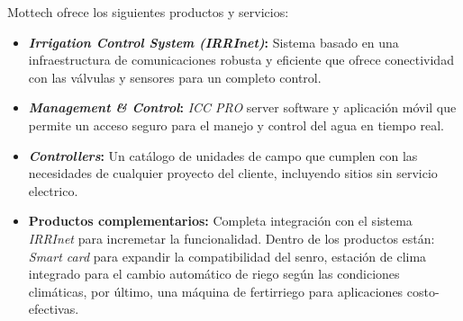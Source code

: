 Mottech ofrece los siguientes productos y servicios:
\begin{itemize}
    \item \textbf{\textit{Irrigation Control System (IRRInet)}:} Sistema basado en una infraestructura de comunicaciones robusta y eficiente que ofrece conectividad con las válvulas y sensores para un completo control.
    \item \textbf{\textit{Management \& Control}:} \textit{ICC PRO} server software y aplicación móvil que permite un acceso seguro para el manejo y control del agua en tiempo real.
    \item \textbf{\textit{Controllers}:} Un catálogo de unidades de campo que cumplen con las necesidades de cualquier proyecto del cliente, incluyendo sitios sin servicio electrico.
    \item \textbf{Productos complementarios:} Completa integración con el sistema \textit{IRRInet} para incremetar la funcionalidad. Dentro de los productos están: \textit{Smart card} para expandir la compatibilidad del senro, estación de clima integrado para el cambio automático de riego según las condiciones climáticas, por último, una máquina de fertirriego para aplicaciones costo-efectivas. 
\end{itemize}